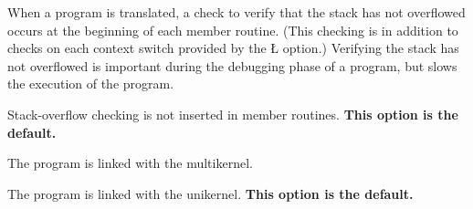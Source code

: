 \documentclass[openright,twoside]{report}
\begin{document}
\begin{prefix}
\item[\LGinlinetrue\LGbegin\lgrinde\L{\LB{\-\V{verify}}}\endlgrinde\LGend{}]
%
When a program is translated, a check to verify that the stack has not overflowed occurs at the beginning of each member routine.
(This checking is in addition to checks on each context switch provided by the \LGinlinetrue\LGbegin\lgrinde\L{}\endlgrinde\LGend{} option.)
Verifying the stack has not overflowed is important during the debugging phase of a \uC program, but slows the execution of the program.

\item[\LGinlinetrue\LGbegin\lgrinde\L{\LB{\-\V{noverify}}}\endlgrinde\LGend{}]
%
Stack-overflow checking is not inserted in member routines.
\textbf{This option is the default.}

\item[\LGinlinetrue\LGbegin\lgrinde\L{\LB{\-\V{multi}}}\endlgrinde\LGend{}]
%
The program is linked with the multikernel.

\item[\LGinlinetrue\LGbegin\lgrinde\L{\LB{\-\V{nomulti}}}\endlgrinde\LGend{}]
%
The program is linked with the unikernel.
\textbf{This option is the default.}

% 


\end{prefix}
\end{document}
